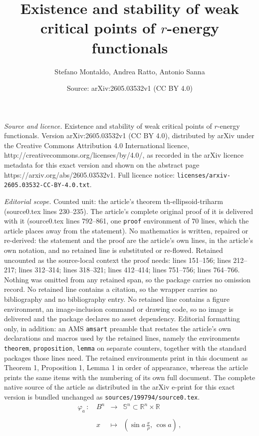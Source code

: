 \documentclass[10pt,a4paper]{amsart}
\title{Existence and stability of weak critical points of $r$-energy functionals}
\author{Stefano Montaldo, Andrea Ratto, Antonio Sanna}
\date{Source: arXiv:2605.03532v1 (CC BY 4.0)}
\def \R{{\mathbb R}}
\def \s{{\mathbb S}}
\begin{document}
\maketitle

\noindent\emph{Source and licence.} Existence and stability of weak critical points of $r$-energy functionals. Version arXiv:2605.03532v1 (CC BY 4.0), distributed by arXiv under the Creative Commons Attribution 4.0 International licence, http://creativecommons.org/licenses/by/4.0/, as recorded in the arXiv licence metadata for this exact version and shown on the abstract page https://arxiv.org/abs/2605.03532v1. Full licence notice: \texttt{licenses/arxiv-2605.03532-CC-BY-4.0.txt}.\par\smallskip

\noindent\textit{Editorial scope.} Counted unit: the article's theorem th-ellipsoid-triharm (source0.tex lines 230--235). The article's complete original proof of it is delivered with it (source0.tex lines 792--861, one \texttt{proof} environment of 70 lines, which the article places away from the statement). No mathematics is written, repaired or re-derived: the statement and the proof are the article's own lines, in the article's own notation, and no retained line is substituted or re-flowed.  Retained uncounted as the source-local context the proof needs: lines 151--156; lines 212--217; lines 312--314; lines 318--321; lines 412--414; lines 751--756; lines 764--766.  Nothing was omitted from any retained span, so the package carries no omission record.  No retained line contains a citation, so the wrapper carries no bibliography and no bibliography entry.  No retained line contains a figure environment, an image-inclusion command or drawing code, so no image is delivered and the package declares no asset dependency.  Editorial formatting only, in addition: an AMS \texttt{amsart} preamble that restates the article's own declarations and macros used by the retained lines, namely the environments \texttt{theorem}, \texttt{proposition}, \texttt{lemma} on separate counters, together with the standard packages those lines need.  The retained environments print in this document as Theorem 1, Proposition 1, Lemma 1 in order of appearance, whereas the article prints the same items with the numbering of its own full document.  The complete native source of the article as distributed in the arXiv e-print for this exact version is bundled unchanged as \texttt{sources/199794/source0.tex}.
\begin{equation}\label{symmetricmaps}\begin{array}{lcll}
                                           \varphi_{a} \,:\, &B^n &\to &  \s^n \subset \R^n \times \R \\
                                           &&& \\
                                           &x &\mapsto & ( \sin a\,{\frac{x}{\rho}}, \,\cos a) \, ,
                                         \end{array}
\end{equation}
\end{document}
